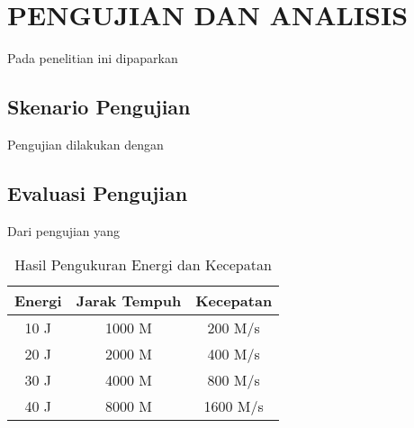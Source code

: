 \chapter{PENGUJIAN DAN ANALISIS}
\label{chap:pengujiananalisis}


Pada penelitian ini dipaparkan

\section{Skenario Pengujian}
\label{sec:skenariopengujian}

Pengujian dilakukan dengan

\section{Evaluasi Pengujian}
\label{sec:analisispengujian}

Dari pengujian yang

\begin{longtable}{|c|c|c|}
  \caption{Hasil Pengukuran Energi dan Kecepatan}
  \label{tb:EnergiKecepatan}                                   \\
  \hline
  \rowcolor[HTML]{C0C0C0}
  \textbf{Energi} & \textbf{Jarak Tempuh} & \textbf{Kecepatan} \\
  \hline
  10 J            & 1000 M                & 200 M/s            \\
  20 J            & 2000 M                & 400 M/s            \\
  30 J            & 4000 M                & 800 M/s            \\
  40 J            & 8000 M                & 1600 M/s           \\
  \hline
\end{longtable}

